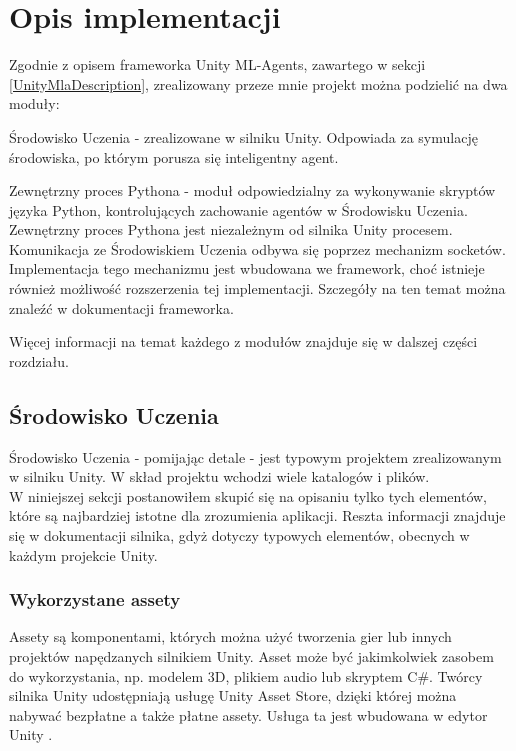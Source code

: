\chapter{Opis implementacji}
Zgodnie z opisem frameworka Unity ML-Agents, zawartego w sekcji \ref{UnityMlaDescription}, zrealizowany przeze mnie projekt można podzielić na dwa moduły:

\begin{enumerate*}
\item Środowisko Uczenia - zrealizowane w silniku Unity. Odpowiada za symulację środowiska, po którym porusza się inteligentny agent.
\item Zewnętrzny proces Pythona - moduł odpowiedzialny za wykonywanie skryptów języka Python, kontrolujących zachowanie agentów w Środowisku Uczenia. \\
Zewnętrzny proces Pythona jest niezależnym od silnika Unity procesem. Komunikacja ze Środowiskiem Uczenia odbywa się poprzez mechanizm socketów. Implementacja tego mechanizmu jest wbudowana we framework, choć istnieje również możliwość rozszerzenia tej implementacji. Szczegóły na ten temat można znaleźć w dokumentacji frameworka.
\end{enumerate*}

Więcej informacji na temat każdego z modułów znajduje się w dalszej części rozdziału.

\section{Środowisko Uczenia}
Środowisko Uczenia - pomijając detale - jest typowym projektem zrealizowanym w silniku Unity. W skład projektu wchodzi wiele katalogów i plików. \\
W niniejszej sekcji postanowiłem skupić się na opisaniu tylko tych elementów, które są najbardziej istotne dla zrozumienia aplikacji. Reszta informacji znajduje się w dokumentacji silnika, gdyż dotyczy typowych elementów, obecnych w każdym projekcie Unity.

\subsection{Wykorzystane assety}
Assety są komponentami, których można użyć tworzenia gier lub innych projektów napędzanych silnikiem Unity. Asset może być jakimkolwiek zasobem do wykorzystania, np. modelem 3D, plikiem audio lub skryptem C\#. Twórcy silnika Unity udostępniają usługę Unity Asset Store, dzięki której można nabywać bezpłatne a także płatne assety. Usługa ta jest wbudowana w edytor Unity \cite{unity:assetStore}.

